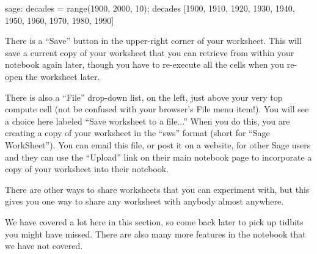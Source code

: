 %
\begin{sageexample}
sage: decades = range(1900, 2000, 10); decades
[1900, 1910, 1920, 1930, 1940, 1950, 1960, 1970, 1980, 1990]
\end{sageexample}
%
There is a ``Save'' button in the upper-right corner of your worksheet.  This will save a current copy of your worksheet that you can retrieve from within your notebook again later, though you have to re-execute all the cells when you re-open the worksheet later.\par
%
There is also a ``File'' drop-down list, on the left, just above your very top compute cell (not be confused with your browser's File menu item!).  You will see a choice here labeled  ``Save worksheet to a file...''  When you do this, you are creating a copy of your worksheet in the ``sws'' format (short for ``Sage WorkSheet'').  You can email this file, or post it on a website, for other Sage users and they can use the ``Upload'' link on their main notebook page to incorporate a copy of your worksheet into their notebook.\par
%
There are other ways to share worksheets that you can experiment with, but this gives you one way to share any worksheet with anybody almost anywhere.\par
%
We have covered a lot here in this section, so come back later to pick up tidbits you might have missed.  There are also many more features in the notebook that we have not covered.
%
\begin{sageverbatim}
\end{sageverbatim}
%
